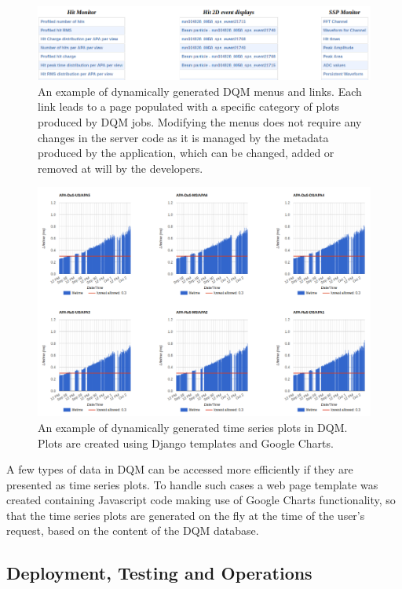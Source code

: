 \documentclass{webofc}
\begin{document}
\begin{figure}[tb]
\centering\includegraphics[width=1.0\textwidth]{figures/tpc_monitor_2018_v2.png}
\caption{\label{fig:tpc_monitor}An example of dynamically generated DQM menus and links. Each link leads to
a page populated with a specific category of plots produced by DQM jobs. Modifying the menus does not require
any changes in the server code as it is managed by the metadata produced by the application, which can be changed,
added or removed at will by the developers.}
\end{figure}

\begin{figure}[tb]
\centering\includegraphics[width=1.0\textwidth]{figures/purity_chart_2018_v2.png}
\caption{\label{fig:purity_chart}An example of dynamically generated time series plots in DQM. Plots are created
using Django templates and Google Charts.}
\end{figure}

A few types of data in DQM can be accessed more efficiently if they are presented as time
series plots. To handle such cases a web page template was created containing
Javascript code making use of Google Charts functionality, so that the time series
plots are generated on the fly at the time of the user's request, based on the content
of the DQM database.

\subsection{Deployment, Testing and Operations}
\end{document}
